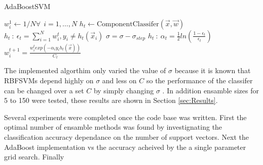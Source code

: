 \begin{algorithm}
\caption{AdaBoostSVM}
\label{algo:AdaBoostSVM}
\begin{algorithmic}[1]
\State $w_{i}^{1} \gets 1/N \forall ~~ i=1,\dots,N$
    \label{marker}
    \State $h_t \gets \text{ComponentClassifer}(\vec{x},\vec{w})$
    \State $h_t~:~\epsilon_t = \sum_{i=1}^{N}w_{i}^{t} , y_i \ne h_t(\vec{x}_i)$
        \State $\sigma = \sigma - \sigma_{step}$
        \State {}
    \EndIf
    \State $h_t~:~\alpha_t = \frac{1}{2} ln\left ( \frac{1-\epsilon_t}{\epsilon_t}\right)$
    \State $w_i^{t+1} = \frac{w_i^{t} exp\left ( -\alpha_i y_i h_t(\vec{x})\right)}{C_t}$
\EndWhile
\Statex
{}
\EndProcedure
\end{algorithmic}
\end{algorithm}

The implemented algorthim only varied the value of $\sigma$ because it is known that RBFSVMs depend highly on $\sigma$ and less on $C$ so the performance of the classifer can be changed over a set $C$ by simply changing $\sigma$ \cite{li_adaboost_2008}.
In addition ensamble sizes for 5 to 150 were tested, these results are shown in Section \ref{sec:Results}.

Several experiments were completed once the code base was written.
First the optimal number of ensamble methods was found by investignating the classification accuracy dependance on the number of support vectors.
Next the AdaBoost implementation vs the accuracy acheived by the a single parameter grid search.
Finally
